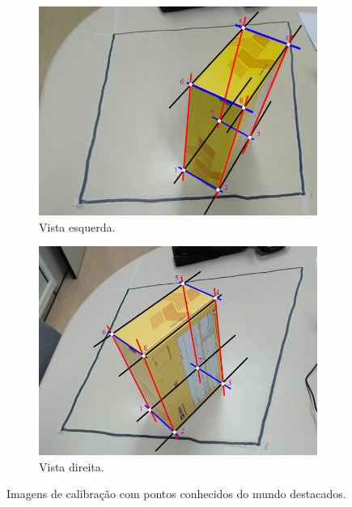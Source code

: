 \begin{figure}[H]
	\centering
	\begin{subfigure}[H]{0.49\textwidth}
		\includegraphics[width = \textwidth]{../../data/i7_L_axis.png}
		\caption{Vista esquerda.}
		\label{fig:i7_L_axis}
	\end{subfigure}
	\begin{subfigure}[H]{0.49\textwidth}
		\centering
		\includegraphics[width = \textwidth]{../../data/i7_R_axis.png}
		\caption{Vista direita.}
		\label{fig:i7_R_axis}
	\end{subfigure}
	\caption{Imagens de calibração com pontos conhecidos do mundo destacados.}
\end{figure}

